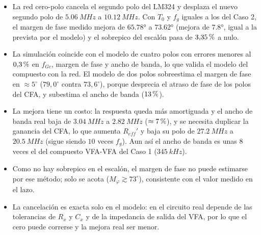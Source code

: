 \begin{itemize}
    \item La red cero-polo cancela el segundo polo del LM324 y desplaza el nuevo segundo polo de $\SI{5,06}{MHz}$ a $\SI{10,12}{MHz}$. Con $T_0$ y $f_g$ iguales a los del Caso 2, el margen de fase medido mejora de $\ang{65,78}$ a $\ang{73,62}$ (mejora de $\ang{7,8}$, igual a la prevista por el modelo) y el sobrepico del escalón pasa de $3{,}35\,\mathrm{\char37}$ a nulo.
    \item La simulación coincide con el modelo de cuatro polos con errores menores al $0{,}3\,\mathrm{\char37}$ en $f_{Gc}$, margen de fase y ancho de banda, lo que valida el modelo del compuesto con la red. El modelo de dos polos sobreestima el margen de fase en $\approx5^\circ$ ($79{,}0^\circ$ contra $73{,}6^\circ$), porque desprecia el atraso de fase de los polos del CFA, y subestima el ancho de banda ($13\,\mathrm{\char37}$).
    \item La mejora tiene un costo: la respuesta queda más amortiguada y el ancho de banda real baja de $\SI{3,04}{MHz}$ a $\SI{2,82}{MHz}$ ($\approx7\,\mathrm{\char37}$), y se necesita duplicar la ganancia del CFA, lo que aumenta $R_{eff}'$ y baja su polo de $\SI{27,2}{MHz}$ a $\SI{20,5}{MHz}$ (sigue siendo $10$ veces $f_g$). Aun así el ancho de banda es unas $8$ veces el del compuesto VFA-VFA del Caso 1 ($\SI{345}{kHz}$).
    \item Como no hay sobrepico en el escalón, el margen de fase no puede estimarse por ese método; solo se acota ($M_\varphi \gtrsim 73^\circ$), consistente con el valor medido en el lazo.
    \item La cancelación es exacta solo en el modelo: en el circuito real depende de las tolerancias de $R_x$ y $C_x$ y de la impedancia de salida del VFA, por lo que el cero puede correrse y la mejora real ser menor.
\end{itemize}
